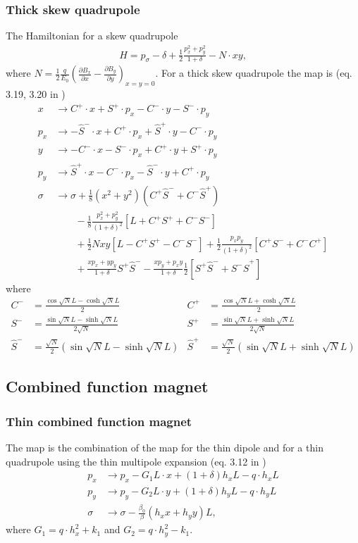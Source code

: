 \documentclass[english]{article}
\begin{document}
\subsubsection{Thick skew quadrupole}
The Hamiltonian for a skew quadrupole
\begin{align}
    H = p_\sigma-\delta+\frac{1}{2}\frac{p_x^2+p_y^2}{1+\delta}-N\cdot xy,
\end{align}
where $N=\frac{1}{2}\frac{q}{E_0}\left(\frac{\partial B_x}{\partial x} - 
\frac{\partial B_y}{\partial y}\right)_{x=y=0}$.
For a thick skew quadrupole the map is (eq. 3.19, 3.20 in \cite{ripken85})
\begin{align}
    x &\to C^+\cdot x+S^+\cdot p_x-C^-\cdot y-S^-\cdot p_y \\
    p_x &\to -\hat{S}^-\cdot x+C^+\cdot p_x+\hat{S}^+\cdot y-C^-\cdot p_y \\
    y &\to -C^-\cdot x-S^-\cdot p_x+C^+\cdot y+S^+\cdot p_y \\
    p_y &\to \hat{S}^+\cdot x -C^-\cdot p_x -\hat{S}^-\cdot y + C^+\cdot p_y \\
    \sigma &\to \sigma + \frac{1}{8}(x^2+y^2)\left(C^+\hat{S}^-+C^-\hat{S}^+\right) \\
    &\qquad-\frac{1}{8}\frac{p_x^2+p_y^2}{(1+\delta)^2}\left[L+C^+S^++C^-S^-\right] \\
    &\qquad+\frac{1}{2}Nxy\left[L-C^+S^+-C^-S^-\right] 
    +\frac{1}{2} \frac{p_xp_y}{(1+\delta)^2} \left[C^+S^-+C^-C^+\right] \\
    &\qquad+\frac{xp_x+yp_y}{1+\delta}S^+\hat{S}^--\frac{xp_y+p_xy}{1+\delta}\frac{1}{2}
    \left[S^+\hat{S}^-+S^-\hat{S}^+\right]
\end{align}
where 
\begin{align}
    C^-&=\frac{\cos\sqrt{N}L-\cosh\sqrt{N}L}{2} &
    C^+&=\frac{\cos\sqrt{N}L+\cosh\sqrt{N}L}{2} \\
    S^-&=\frac{\sin\sqrt{N}L-\sinh\sqrt{N}L}{2\sqrt{N}} &
    S^+&=\frac{\sin\sqrt{N}L+\sinh\sqrt{N}L}{2\sqrt{N}} \\
    \hat{S}^-&=\frac{\sqrt{N}}{2}(\sin\sqrt{N}L-\sinh\sqrt{N}L) &
    \hat{S}^+&=\frac{\sqrt{N}}{2}(\sin\sqrt{N}L+\sinh\sqrt{N}L)
\end{align}

\subsection{Combined function magnet}

\subsubsection{Thin combined function magnet}
The map is the combination of the map for the thin dipole and for a thin quadrupole using 
the thin multipole expansion (eq. 3.12 in \cite{ripken95})
\begin{align}
  p_x &\to p_x - G_1 L \cdot x + (1+\delta)h_x L - q\cdot h_xL \\
  p_y &\to p_y - G_2 L \cdot y +(1+\delta) h_y L - q\cdot h_yL\\
  \sigma &\to \sigma - \frac{\beta_0}{\beta}(h_xx+h_yy) L,
\end{align}
where $G_1=q \cdot h_x^2+k_1$ and $G_2=q \cdot h_y^2-k_1$.
\end{document}
